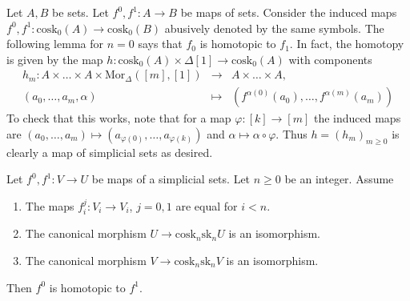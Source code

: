 \noindent
Let $A, B$ be sets. Let $f^0, f^1 : A \to B$ be maps of sets.
Consider the induced maps $f^0, f^1 : \text{cosk}_0(A) \to \text{cosk}_0(B)$
abusively denoted by the same symbols. The following lemma for $n = 0$
says that $f_0$ is homotopic to $f_1$. In fact, the
homotopy is given by the map $h : \text{cosk}_0(A) \times
\Delta[1] \to \text{cosk}_0(A)$ with components
\begin{eqnarray*}
h_m : A \times \ldots \times A \times \text{Mor}_{\Delta}([m], [1])
& \longrightarrow &
A \times \ldots \times A, \\
(a_0, \ldots, a_m, \alpha) & \longmapsto &
(f^{\alpha(0)}(a_0), \ldots, f^{\alpha(m)}(a_m))
\end{eqnarray*}
To check that this works, note that for a map $\varphi : [k] \to [m]$
the induced maps are
$(a_0, \ldots, a_m) \mapsto (a_{\varphi(0)}, \ldots, a_{\varphi(k)})$
and $\alpha \mapsto \alpha \circ \varphi$. Thus $h = (h_m)_{m \geq 0}$
is clearly a map of simplicial sets as desired.

\begin{lemma}
\label{lemma-homotopy}
Let $f^0, f^1 : V \to U$ be maps of a simplicial sets.
Let $n \geq 0$ be an integer.
Assume
\begin{enumerate}
\item The maps $f^j_i : V_i \to V_i$, $j = 0, 1$ are equal for $i < n$.
\item The canonical morphism $U \to \text{cosk}_n \text{sk}_n U$
is an isomorphism.
\item The canonical morphism $V \to \text{cosk}_n \text{sk}_n V$
is an isomorphism.
\end{enumerate}
Then $f^0$ is homotopic to $f^1$.
\end{lemma}


